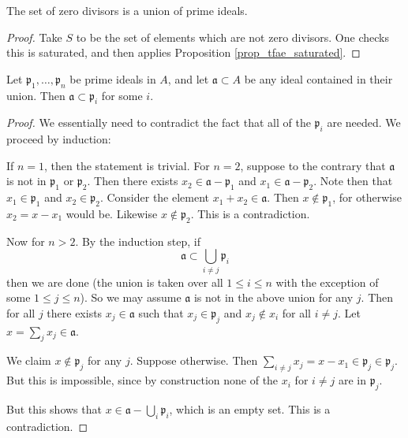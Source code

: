\documentclass[12pt]{article}
\begin{document}
\begin{corollary}
	The set of zero divisors is a union of prime ideals.
\end{corollary}
\begin{proof}
	Take $S$ to be the set of elements which are not zero divisors. One checks this is saturated, and then applies Proposition \ref{prop_tfae_saturated}. 
\end{proof}

\begin{theorem}
	Let $\mathfrak{p}_1,\dots,\mathfrak{p}_n$ be prime ideals in $A$, and let $\mathfrak{a}\subset A$ be any ideal contained in their union. Then $\mathfrak{a}\subset \mathfrak{p}_i$ for some $i$.
\end{theorem}
\begin{proof}
	We essentially need to contradict the fact that all of the $\mathfrak{p}_i$ are needed. We proceed by induction:

	If $n=1$, then the statement is trivial. For $n=2$, suppose to the contrary that $\mathfrak{a}$ is not in $\mathfrak{p}_1$ or $\mathfrak{p}_2$. Then there exists $x_2\in\mathfrak{a}-\mathfrak{p}_1$ and $x_1\in\mathfrak{a}-\mathfrak{p}_2$. Note then that $x_1\in\mathfrak{p}_1$ and $x_2\in\mathfrak{p}_2$. Consider the element $x_1+x_2\in\mathfrak{a}$. Then $x\not\in\mathfrak{p}_1$, for otherwise $x_2=x-x_1$ would be. Likewise $x\not\in\mathfrak{p}_2$. This is a contradiction.

	Now for $n>2$. By the induction step, if 
	\begin{equation*}
		\mathfrak{a}\subset \bigcup_{i\neq j} \mathfrak{p}_i
	\end{equation*}
	then we are done (the union is taken over all $1\leq i\leq n$ with the exception of some $1\leq j\leq n$). So we may assume $\mathfrak{a}$ is not in the above union for any $j$. Then for all $j$ there exists $x_j\in\mathfrak{a}$ such that $x_j\in \mathfrak{p}_j$ and $x_j\not\in x_i$ for all $i\neq j$. Let $x=\sum_j x_j\in\mathfrak{a}$.  

	We claim $x\not\in\mathfrak{p}_j$ for any $j$. Suppose otherwise. Then $\sum_{i\neq j}x_j = x-x_1\in\mathfrak{p}_j \in\mathfrak{p}_j$. But this is impossible, since by construction none of the $x_i$ for $i\neq j$ are in $\mathfrak{p}_j$.

	But this shows that $x\in\mathfrak{a}-\bigcup_{i}\mathfrak{p}_i$, which is an empty set. This is a contradiction.
\end{proof}
\end{document}

